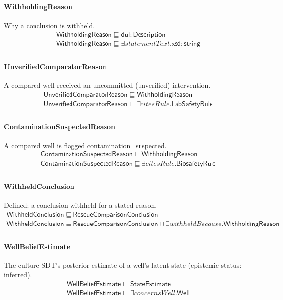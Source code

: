 \documentclass[10pt]{article}
\begin{document}
\paragraph{WithholdingReason} Why a conclusion is withheld.
\[\begin{array}{l}
\mathsf{WithholdingReason} \sqsubseteq  \mathsf{dul{:}Description} \\
\mathsf{WithholdingReason} \sqsubseteq  \exists \mathit{statementText}.\mathsf{xsd{:}string} \\
\end{array}\]
\paragraph{UnverifiedComparatorReason} A compared well received an uncommitted (unverified) intervention.
\[\begin{array}{l}
\mathsf{UnverifiedComparatorReason} \sqsubseteq  \mathsf{WithholdingReason} \\
\mathsf{UnverifiedComparatorReason} \sqsubseteq  \exists \mathit{citesRule}.\mathsf{LabSafetyRule} \\
\end{array}\]
\paragraph{ContaminationSuspectedReason} A compared well is flagged contamination\_suspected.
\[\begin{array}{l}
\mathsf{ContaminationSuspectedReason} \sqsubseteq  \mathsf{WithholdingReason} \\
\mathsf{ContaminationSuspectedReason} \sqsubseteq  \exists \mathit{citesRule}.\mathsf{BiosafetyRule} \\
\end{array}\]
\paragraph{WithheldConclusion} Defined: a conclusion withheld for a stated reason.
\[\begin{array}{l}
\mathsf{WithheldConclusion} \sqsubseteq  \mathsf{RescueComparisonConclusion} \\
\mathsf{WithheldConclusion} \equiv  \mathsf{RescueComparisonConclusion} \sqcap  \exists \mathit{withheldBecause}.\mathsf{WithholdingReason} \\
\end{array}\]
\paragraph{WellBeliefEstimate} The culture SDT's posterior estimate of a well's latent state (epistemic status: inferred).
\[\begin{array}{l}
\mathsf{WellBeliefEstimate} \sqsubseteq  \mathsf{StateEstimate} \\
\mathsf{WellBeliefEstimate} \sqsubseteq  \exists \mathit{concernsWell}.\mathsf{Well} \\
\end{array}\]
\end{document}
